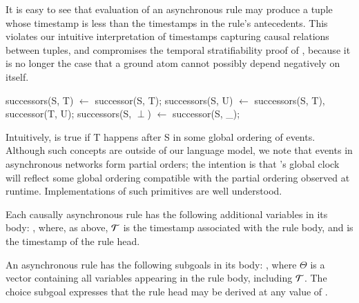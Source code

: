 It is easy to see that evaluation of an asynchronous rule may produce a tuple whose timestamp is less than the timestamps
in the rule's antecedents.  This violates our intuitive interpretation of timestamps capturing causal relations between 
tuples, and compromises the temporal stratifiability proof of \slang, because it is no longer the case that a ground atom
cannot possibly depend negatively on itself.






\begin{Dedalus}
successors(S, T) \(\leftarrow\) successor(S, T);
successors(S, U) \(\leftarrow\) successors(S, T), successor(T, U);
successors(S, \(\perp\)) \(\leftarrow\) successor(S, _);
\end{Dedalus}

Intuitively,  is true if T happens after S
in some global ordering of events.  Although such concepts are outside
of our language model, we note that events in asynchronous networks
form partial orders; the intention is that \lang's global clock will
reflect some global ordering compatible with the partial ordering
observed at runtime.  Implementations of such primitives are well
understood.

Each causally asynchronous rule has the following additional variables in its
body: , where, as above,
$\Tau$ is the timestamp associated with the rule body, and
 is the timestamp of the rule head.








An asynchronous rule has the following
subgoals in its body: , where
$\Theta$ is a vector containing all variables appearing in the rule body,
including $\Tau$.  The choice subgoal expresses that the rule head may be
derived at any value of .

